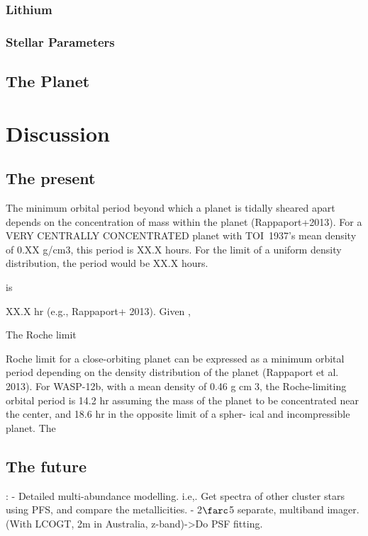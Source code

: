 \documentclass[12pt,twocolumn,tighten]{aastex63}
\newcommand{\tn}{TOI~1937} %
\begin{document}
\subsubsection{Lithium}

\subsubsection{Stellar Parameters}
\label{subsec:starparams}

\subsection{The Planet}
\label{subsec:planet}


\section{Discussion}
\label{sec:discussion}

\subsection{The present}

The minimum orbital period beyond which a planet is tidally sheared
apart depends on the concentration of mass within the planet
(Rappaport+2013).
For a VERY CENTRALLY CONCENTRATED planet with \tn's
mean density of 0.XX g/cm3, this period is XX.X hours.
For the limit of a uniform density distribution, the period would be
XX.X hours.

is 

XX.X hr (e.g., Rappaport+ 2013).
Given ,


The Roche limit 

Roche limit for a close-orbiting planet can
be expressed as a minimum orbital period depending
on the density distribution of the planet (Rappaport
et al. 2013). For WASP-12b, with a mean density of
0.46 g cm􀀀3, the Roche-limiting orbital period is 14.2 hr
assuming the mass of the planet to be concentrated near
the center, and 18.6 hr in the opposite limit of a spher-
ical and incompressible planet. The

\subsection{The future}:
- Detailed multi-abundance modelling.
  i.e,. Get spectra of other cluster stars using PFS, and compare the metallicities.
- 2$\farc$5 separate, multiband imager. (With LCOGT, 2m in Australia,
  z-band)->Do PSF fitting.
\end{document}
